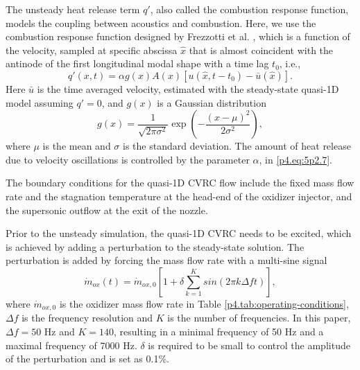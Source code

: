 The unsteady heat release term $q'$, also called the combustion response function, models the coupling between acoustics and combustion. Here, we use the combustion response function designed by Frezzotti et al. \cite{frezzotti2017numerical,frezzotti2018quasi}, which is a function of the velocity, sampled at specific abscissa $\hat{x}$ that is almost coincident with the antinode of the first longitudinal modal shape with a time lag $t_0$, i.e.,
\begin{equation}\label{p4.eq:5p2.7}
q'\left( x,t\right) = \alpha g\left(x\right)  A\left(x\right) \left[ u\left( \hat{x},t-t_0 \right) - \bar{u}\left( \hat{x} \right) \right].
\end{equation}
Here $\bar{u}$ is the time averaged velocity, estimated with the steady-state quasi-1D model assuming $q'=0$, and $g(x)$ is a Gaussian distribution  
\begin{equation}\label{eq:5p2.8}
g\left(x\right)= \frac{1}{\sqrt{2\pi\sigma^2}} \exp\left( -\frac{\left(x-\mu\right)^2}{2\sigma^2} \right),
\end{equation}
where $\mu$ is the mean and $\sigma$ is the standard deviation. The amount of heat release due to velocity oscillations is controlled by the parameter $\alpha$, in \eqref{p4.eq:5p2.7}.

The boundary conditions for the quasi-1D CVRC flow include the fixed mass flow rate and the stagnation temperature at the head-end of the oxidizer injector, and the supersonic outflow at the exit of the nozzle.

Prior to the unsteady simulation, the quasi-1D CVRC needs to be excited, which is achieved by adding a perturbation to the steady-state solution. The perturbation is added by forcing the mass flow rate with a multi-sine signal
\begin{equation}\label{eq:5p2.9}
\dot{m}_{ox} \left(t\right)= \dot{m}_{ox,0} \left[1 + \delta\sum_{k=1}^{K}  sin\left(2\pi k\Delta f t\right) \right],
\end{equation}
where $\dot{m}_{ox,0}$ is the oxidizer mass flow rate in Table \ref{p4.tab:operating-conditions}, $\Delta f$ is the frequency resolution and $K$ is the number of frequencies. In this paper, $\Delta f = 50 $ Hz and $K=140$, resulting in a minimal frequency of 50 Hz and a maximal frequency of 7000 Hz. $\delta$ is required to be small to control the amplitude of the perturbation and is set as 0.1\%.

